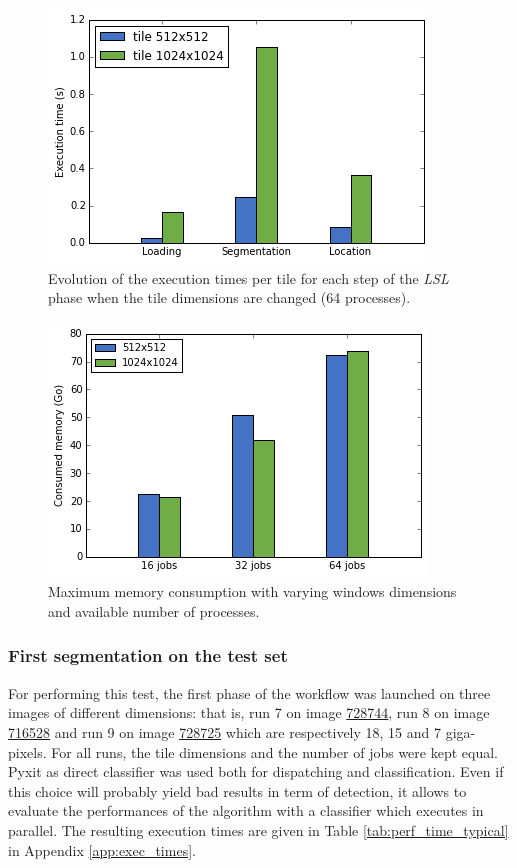 \begin{figure}
	\center
	\includegraphics[scale=0.5]{image/perf_lsl_tile_dim.png}
	\caption{Evolution of the execution times per tile for each step of the \textit{LSL} phase when the tile dimensions are changed (64 processes).}
	\label{fig:perf_tile_dim_lsl}
\end{figure}

\begin{figure}
	\center
	\includegraphics[scale=0.5]{image/perf_memory.png}
	\caption{Maximum memory consumption with varying windows dimensions and available number of processes.}
	\label{fig:perf_memory}
\end{figure}

\subsubsection{First segmentation on the test set}
\label{sssec:perf_second_test}
For performing this test, the first phase of the workflow was launched on three images of different dimensions: that is, run 7 on image \href{http://beta.cytomine.be/#tabs-image-716498-728744-}{728744}, run 8 on image \href{http://beta.cytomine.be/#tabs-image-716498-716528-}{716528} and run 9 on image \href{http://beta.cytomine.be/#tabs-image-716498-728725-}{728725} which are respectively 18, 15 and 7 giga-pixels. For all runs, the tile dimensions and the number of jobs were kept equal. Pyxit as direct classifier was used both for dispatching and classification. Even if this choice will probably yield bad results in term of detection, it allows to evaluate the performances of the algorithm with a classifier which executes in parallel. The resulting execution times are given in Table \ref{tab:perf_time_typical} in Appendix \ref{app:exec_times}.

